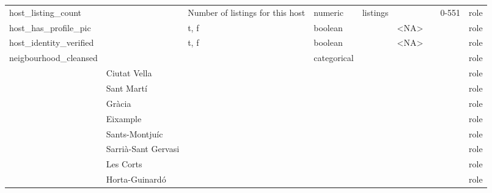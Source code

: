 \begin{center}
\begin{longtable}{@{}llllllll@{}}
host\_listing\_count        &                             & Number of listings for this host & numeric     & listings       &                             &                     & 0-551   & role \\
host\_has\_profile\_pic     &                             & t, f & boolean     &                & \textless{}NA\textgreater{} &                     &         & role \\
host\_identity\_verified    &                             & t, f & boolean     &                & \textless{}NA\textgreater{} &                     &         & role \\
neigbourhood\_cleansed      &                             &                                   & categorical &                &                             &                     &         & role \\
                            & Ciutat Vella                &                                   &             &                &                             &                     &         & role \\
                            & Sant Martí                  &                                   &             &                &                             &                     &         & role \\
                            & Gràcia                      &                                   &             &                &                             &                     &         & role \\
                            & Eixample                    &                                   &             &                &                             &                     &         & role \\
                            & Sants-Montjuíc              &                                   &             &                &                             &                     &         & role \\
                            & Sarrià-Sant Gervasi         &                                   &             &                &                             &                     &         & role \\
                            & Les Corts                   &                                   &             &                &                             &                     &         & role \\
                            & Horta-Guinardó              &                                   &             &                &                             &                     &         & role \\

\end{longtable}
\end{center}
